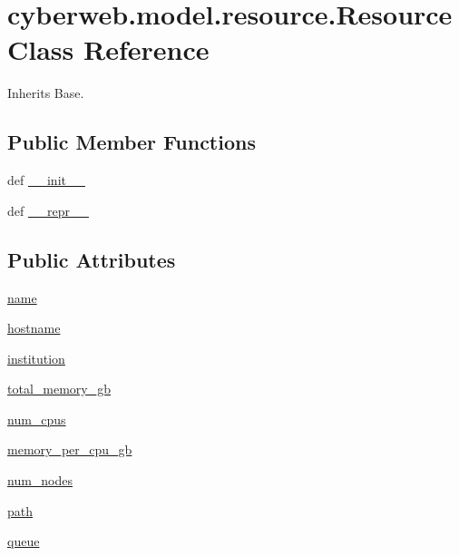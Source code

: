 \hypertarget{classcyberweb_1_1model_1_1resource_1_1_resource}{\section{cyberweb.\-model.\-resource.\-Resource \-Class \-Reference}
\label{classcyberweb_1_1model_1_1resource_1_1_resource}
}


\-Inherits \-Base.

\subsection*{\-Public \-Member \-Functions}
\begin{DoxyCompactItemize}
\item 
def \hyperlink{classcyberweb_1_1model_1_1resource_1_1_resource_a7b8ce7b4884d39dae3d5c65af15f972f}{\-\_\-\-\_\-init\-\_\-\-\_\-}
\item 
def \hyperlink{classcyberweb_1_1model_1_1resource_1_1_resource_a8e48afd32f2e4a216a377b2bf3fb14d8}{\-\_\-\-\_\-repr\-\_\-\-\_\-}
\end{DoxyCompactItemize}
\subsection*{\-Public \-Attributes}
\begin{DoxyCompactItemize}
\item 
\hyperlink{classcyberweb_1_1model_1_1resource_1_1_resource_a8b41aff006149c95927f5ac1f8b48d6c}{name}
\item 
\hyperlink{classcyberweb_1_1model_1_1resource_1_1_resource_acb12946572c67f984297164790c65c6c}{hostname}
\item 
\hyperlink{classcyberweb_1_1model_1_1resource_1_1_resource_a149b0c8d741c5de34bcc44fe6179c750}{institution}
\item 
\hyperlink{classcyberweb_1_1model_1_1resource_1_1_resource_ae93dd196a260853891e73b167ef6eb4c}{total\-\_\-memory\-\_\-gb}
\item 
\hyperlink{classcyberweb_1_1model_1_1resource_1_1_resource_aca02955b128ae84c1697b028bfadb7f0}{num\-\_\-cpus}
\item 
\hyperlink{classcyberweb_1_1model_1_1resource_1_1_resource_aca52ea8858cb310a6986ec15713c9146}{memory\-\_\-per\-\_\-cpu\-\_\-gb}
\item 
\hyperlink{classcyberweb_1_1model_1_1resource_1_1_resource_a8d5bcf52ac66acea42afdf58bb46a3e8}{num\-\_\-nodes}
\item 
\hyperlink{classcyberweb_1_1model_1_1resource_1_1_resource_a7ed822ef7fc7ea72022b2708de7548ee}{path}
\item 
\hyperlink{classcyberweb_1_1model_1_1resource_1_1_resource_a930974dd2980d2e8f6b20e7951dc722a}{queue}
\end{DoxyCompactItemize}
